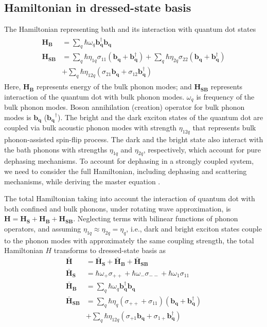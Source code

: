 \documentclass[aps,pra,preprint,groupedaddress]{revtex4-1}
\begin{document}
\subsection{Hamiltonian in dressed-state basis}
\label{appendix:Hamiltonian_Dressed}
The Hamiltonian representing bath and its interaction with quantum dot states
\begin{eqnarray}
\begin{aligned}
\label{eq:H_B}
\mathbf{H_B} &= \sum_q\hbar\omega_q \mathbf{b_q^\dagger}\mathbf{b_q} \\
\label{eq:H_SB}
\mathbf{H_{SB}} &= \sum_q \hbar\eta_{1q}\sigma_{11}(\mathbf{b_q}+\mathbf{b_q^\dagger})+\sum_q\hbar\eta_{2q} \sigma_{22}(\mathbf{b_q}+\mathbf{b_q^\dagger})\\
&+ \sum_q \hbar\eta_{12q}(\sigma_{21}\mathbf{b_q}+\sigma_{12}\mathbf{b_{q}^\dagger}) 
\end{aligned}
\end{eqnarray}
Here, $\mathbf{H_B}$ represents energy of the bulk phonon modes; and $\mathbf{H_{SB}}$ represents interaction of the quantum dot with bulk phonon modes. $\omega_{q}$ is frequency of the bulk phonon modes. Boson annihilation (creation) operator for bulk phonon modes is $\mathbf{b_q}$ ($\mathbf{b_q}^\dagger$). The bright and the dark exciton states of the quantum dot are coupled via bulk acoustic phonon modes with strength $\eta_{12q}$ that represents bulk phonon-assisted spin-flip process. The dark and the bright state also interact with the bath phonons with strengths $\eta_{1q}$ and $\eta_{2q}$, respectively, which account for pure dephasing mechanisms. To account for dephasing in a strongly coupled system, we need to consider the full Hamiltonian, including dephasing and scattering mechanisms, while deriving the master equation \cite{Carmichael1973, Pino2015}. 

The total Hamiltonian taking into account the interaction of quantum dot with both confined and bulk phonons, under rotating wave approximation, is $\mathbf{H}=\mathbf{H_{S}}+\mathbf{H_{B}}+\mathbf{H_{SB}}$. Neglecting terms with bilinear functions of phonon operators, and assuming $\eta_{1q} \approx \eta_{2q}=\eta_{q} $, i.e., dark and bright exciton states couple to the phonon modes with approximately the same coupling strength, the total Hamiltonian $H$ transforms to dressed-state basis as
\begin{equation}
\label{eq:H_DressedState}
\begin{aligned}
\mathbf{\bar{H}} &= \mathbf{\bar{H}_S} + \mathbf{\bar{H}_B} + \mathbf{\bar{H}_{SB}}\\
\mathbf{\bar{H}_S} &= \hbar\omega_{+}\sigma_{++} +\hbar\omega_{-}\sigma_{--}+\hbar\omega_{1}\sigma_{11}\\
\mathbf{\bar{H}_B} &= \sum_q \hbar\omega_q\mathbf{b_q^\dagger}\mathbf{b_q}\\
\mathbf{\bar{H}_{SB}} &= \sum_q \hbar\eta_q (\sigma_{++} +\sigma_{11})(\mathbf{b_q}+\mathbf{b_q^\dagger})\\
&+ \sum_q \hbar\eta_{12q} (\sigma_{+1}\mathbf{b_q}+\sigma_{1+}\mathbf{b_q^\dagger})
\end{aligned}
\end{equation}
\end{document}

